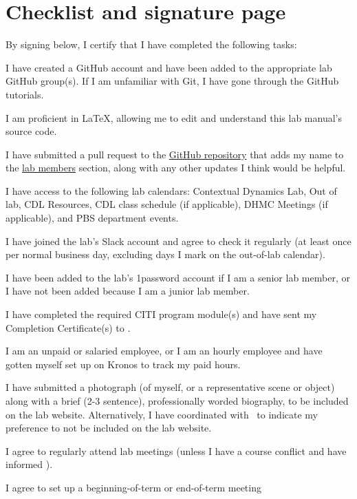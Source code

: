\documentclass{tufte-book} %
\begin{document}
\chapter{Checklist and signature page}
   By signing below, I certify that I have completed the following tasks:
\begin{todolist}
  \item I have created a GitHub account and have been added to the appropriate lab
    GitHub group(s).  If I am unfamiliar with Git, I have gone through
    the GitHub tutorials.
  \item I am proficient in \LaTeX, allowing me to edit and understand
  this lab manual's source code.
  \item I have submitted a pull request to the \href{https://github.com/ContextLab/lab-manual}{GitHub repository} that adds my name to the \hyperref[sec:curr_members]{lab members} section, along with any other updates I think would be helpful.
  \item I have access to the following lab calendars:
    Contextual Dynamics Lab, Out of lab, CDL Resources, CDL class
    schedule (if applicable), DHMC Meetings (if
    applicable), and PBS department events.
   \item I have joined the lab's Slack account and agree to check it
  regularly (at least once per normal business day, excluding days I
  mark on the out-of-lab calendar).
  \item I have been added to the lab's 1password account if I am a
    senior lab member, or I have not been added because I am a junior
    lab member.
  \item I have completed the required CITI program module(s) and have sent my
    Completion Certificate(s) to \coordinator.
  \item I am an unpaid or salaried employee, or I am an hourly
    employee and have gotten myself set up on Kronos to track my paid
    hours.
  \item I have submitted a photograph (of myself, or a
    representative scene or object) along with a brief (2-3 sentence),
    professionally worded biography, to be included on the lab
    website.  Alternatively, I have coordinated with \coordinator~to indicate my
    preference to not be included on the lab website.
  \item I agree to regularly attend lab meetings (unless I have a course
    conflict and have informed \director).
  \item I agree to set up a beginning-of-term or end-of-term meeting

\end{todolist}
\end{document}
